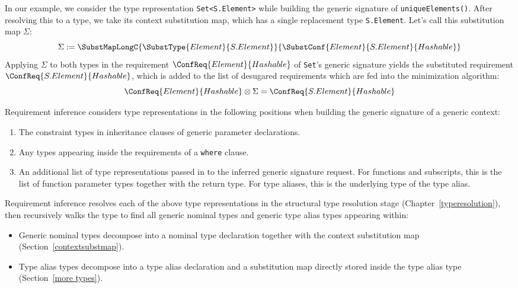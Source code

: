 \documentclass[../generics]{subfiles}
\begin{document}
In our example, we consider the type representation \texttt{Set<S.Element>} while building the generic signature of \texttt{uniqueElements()}. After resolving this to a type, we take its context substitution map, which has a single replacement type \texttt{S.Element}. Let's call this substitution map $\Sigma$:
\[\Sigma:=\SubstMapLongC{\SubstType{Element}{S.Element}}{\SubstConf{Element}{S.Element}{Hashable}}\]
Applying $\Sigma$ to both types in the requirement $\ConfReq{Element}{Hashable}$ of \texttt{Set}'s generic signature yields the substituted requirement $\ConfReq{S.Element}{Hashable}$, which is added to the list of desugared requirements which are fed into the minimization algorithm:
\[\ConfReq{Element}{Hashable}\otimes \Sigma = \ConfReq{S.Element}{Hashable}\]

Requirement inference considers type representations in the following positions when building the generic signature of a generic context:
\begin{enumerate}
\item The constraint types in inheritance clauses of generic parameter declarations.
\item Any types appearing inside the requirements of a \texttt{where} clause.
\item An additional list of type representations passed in to the inferred generic signature request. For functions and subscripts, this is the list of function parameter types together with the return type. For type aliases, this is the underlying type of the type alias.
\end{enumerate}
Requirement inference resolves each of the above type representations in the structural type resolution stage (Chapter~\ref{typeresolution}), then recursively walks the type to find all generic nominal types and generic type alias types appearing within:
\begin{itemize}
\item Generic nominal types decompose into a nominal type declaration together with the context substitution map (Section~\ref{contextsubstmap}).
\item Type alias types decompose into a type alias declaration and a substitution map directly stored inside the type alias type (Section~\ref{more types}).
\end{itemize}
\end{document}
